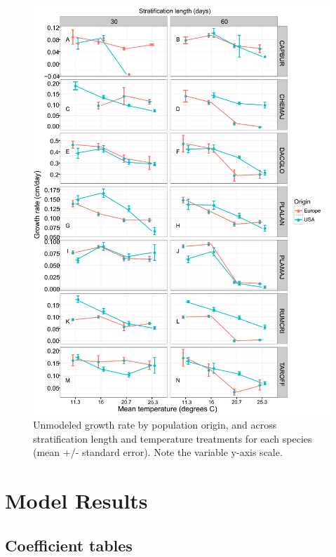 \documentclass[12pt]{article}\usepackage[]{graphicx}\usepackage[]{color}
\begin{document}
\begin{figure}[H]
  \centering
  \includegraphics[scale=.9]{figure9} 
  \caption{Unmodeled growth rate by population origin, and across stratification length and temperature treatments for each   species (mean +/- standard error). Note the variable y-axis scale.} \label{fig:rawgrowth} 
\end{figure}

\section{Model Results}
\subsection{Coefficient tables}
\end{document}

